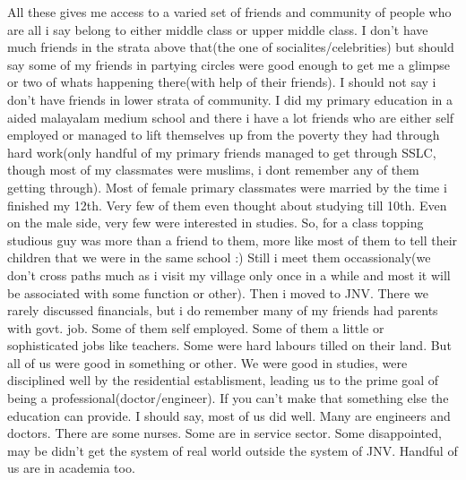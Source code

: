 All these gives me access to a varied set of friends and community of people who are all i say belong to either middle class or upper middle class. I don't have much friends in the strata above that(the one of socialites/celebrities) but should say some of my friends in partying circles were good enough to get me a glimpse or two of whats happening there(with help of their friends). I should not say i don't have friends in lower strata of community. I did my primary education in a aided malayalam medium school and there i have a lot friends who are either self employed or managed to lift themselves up from the poverty they had through hard work(only handful of my primary friends managed to get through SSLC, though most of my classmates were muslims, i dont remember any of them getting through). Most of female primary classmates were married by the time i finished my 12th. Very few of them even thought about studying till 10th. Even on the male side, very few were interested in studies. So, for a class topping studious guy was more than a friend to them, more like most of them to tell their children that we were in the same school :) Still i meet them occassionaly(we don't cross paths much as i visit my village only once in a while and most it will be associated with some function or other). Then i moved to JNV. There we rarely discussed financials, but i do remember many of my friends had parents with govt. job. Some of them self employed. Some of them a little or sophisticated jobs like teachers. Some were hard labours tilled on their land. But all of us were good in something or other. We were good in studies, were disciplined well by the residential establisment, leading us to the prime goal of being a professional(doctor/engineer). If you can't make that something else the education can provide. I should say, most of us did well. Many are engineers and doctors. There are some nurses. Some are in service sector. Some disappointed, may be didn't get the system of real world outside the system of JNV. Handful of us are in academia too. 

